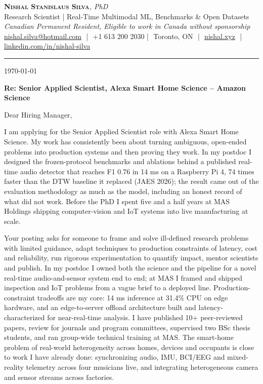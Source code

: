 \documentclass[11pt]{article}
\makeatletter
\newcommand{\clName}{Nishal Stanislaus Silva}
\newcommand{\clEmail}{nishal.silva@hotmail.com}
\newcommand{\clPhone}{+1 613 200 2030}
\newcommand{\clCity}{Toronto, ON}
\newcommand{\clSite}{https://nishal.xyz}
\newcommand{\clLinkedIn}{https://www.linkedin.com/in/nishal-silva}
\newcommand{\clStatus}{Canadian Permanent Resident, Eligible to work in Canada without sponsorship}
\newcommand{\clTagline}{Research Scientist | Real-Time Multimodal ML, Benchmarks \& Open Datasets}
\newcommand{\clRole}{Senior Applied Scientist, Alexa Smart Home Science}
\newcommand{\clCompany}{Amazon Science}
\newcommand{\clAddressee}{Dear Hiring Manager,}
\makeatother
\begin{document}
\pagestyle{empty}
\begin{center}
    {\LARGE \scshape \textbf{\clName}}{\large \textit{, PhD}}\\[1pt]
    {\small \clTagline}\\[1pt]
    {\footnotesize\textit{\clStatus}}\\[1pt]
    {\small
    \href{mailto:\clEmail}{\clEmail} \,\,|\,\, \clPhone \,\,|\,\, \clCity
    \,\,|\,\, \href{\clSite}{nishal.xyz} \,\,|\,\, \href{\clLinkedIn}{linkedin.com/in/nishal-silva}}
\end{center}

\rule{\linewidth}{0.4pt}\vspace{0.6em}

\today

\textbf{Re: \clRole{} -- \clCompany{}}

\clAddressee

I am applying for the Senior Applied Scientist role with Alexa Smart Home Science. My work has consistently been about turning ambiguous, open-ended problems into production systems and then proving they work. In my postdoc I designed the frozen-protocol benchmarks and ablations behind a published real-time audio detector that reaches F1 0.76 in 14 ms on a Raspberry Pi 4, 74 times faster than the DTW baseline it replaced (JAES 2026); the result came out of the evaluation methodology as much as the model, including an honest record of what did not work. Before the PhD I spent five and a half years at MAS Holdings shipping computer-vision and IoT systems into live manufacturing at scale.

Your posting asks for someone to frame and solve ill-defined research problems with limited guidance, adapt techniques to production constraints of latency, cost and reliability, run rigorous experimentation to quantify impact, mentor scientists and publish. In my postdoc I owned both the science and the pipeline for a novel real-time audio-and-sensor system end to end; at MAS I framed and shipped inspection and IoT problems from a vague brief to a deployed line. Production-constraint tradeoffs are my core: 14 ms inference at 31.4\% CPU on edge hardware, and an edge-to-server offload architecture built and latency-characterized for near-real-time analysis. I have published 10+ peer-reviewed papers, review for journals and program committees, supervised two BSc thesis students, and ran group-wide technical training at MAS. The smart-home problem of real-world heterogeneity across homes, devices and occupants is close to work I have already done: synchronizing audio, IMU, BCI/EEG and mixed-reality telemetry across four musicians live, and integrating heterogeneous camera and sensor streams across factories.
\end{document}
